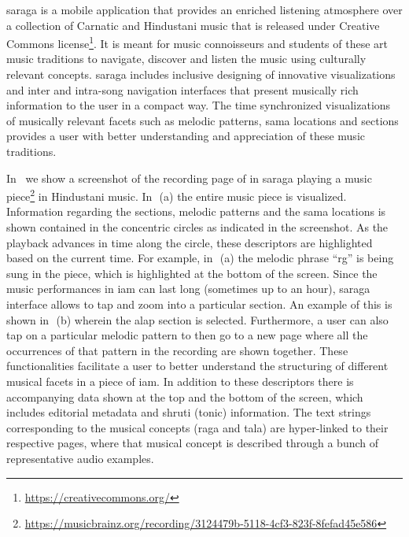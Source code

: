 \Gls{saraga} is a mobile application that provides an enriched listening atmosphere over a collection of Carnatic and Hindustani music that is released under Creative Commons license\footnote{\url{https://creativecommons.org/}}. It is meant for music connoisseurs and students of these art music traditions to navigate, discover and listen the music using culturally relevant concepts. \gls{saraga} includes inclusive designing of innovative visualizations and inter and intra-song navigation interfaces that present musically rich information to the user in a compact way. The time synchronized visualizations of musically relevant facets such as melodic patterns, \gls{sama} locations and sections provides a user with better understanding and appreciation of these music traditions.

In~ we show a screenshot of the recording page of in \gls{saraga} playing a music piece\footnote{\url{https://musicbrainz.org/recording/3124479b-5118-4cf3-823f-8fefad45e586}} in Hindustani music. In~\,(a) the entire music piece is visualized. Information regarding the sections, melodic patterns and the \gls{sama} locations is shown contained in the concentric circles as indicated in the screenshot. As the playback advances in time along the circle, these descriptors are highlighted based on the current time. For example, in~\,(a) the melodic phrase ``rg'' is being sung in the piece, which is highlighted at the bottom of the screen. Since the music performances in \gls{iam} can last long (sometimes up to an hour), \gls{saraga} interface allows to tap and zoom into a particular section. An example of this is shown in~\,(b) wherein the \gls{alap} section is selected. Furthermore, a user can also tap on a particular melodic pattern to then go to a new page where all the occurrences of that pattern in the recording are shown together. These functionalities facilitate a user to better understand the structuring of different musical facets in a piece of \gls{iam}. In addition to these descriptors there is accompanying data shown at the top and the bottom of the screen, which includes editorial metadata and \gls{shruti} (tonic) information. The text strings corresponding to the musical concepts (\gls{raga} and \gls{tala}) are hyper-linked to their respective pages, where that musical concept is described through a bunch of representative audio examples. 


